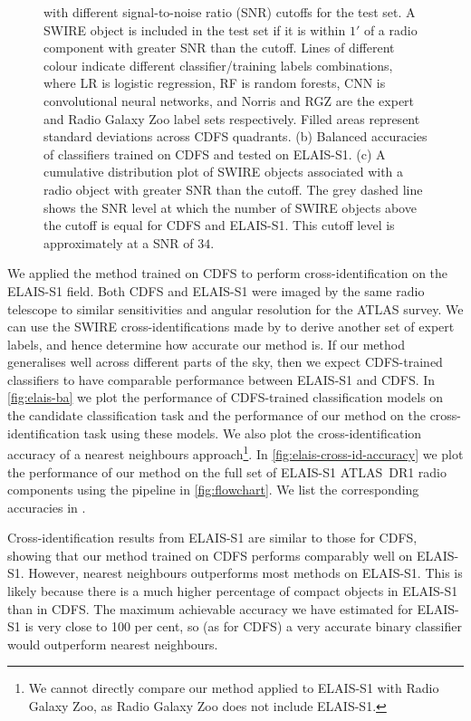 \begin{figure}
{      with different signal-to-noise ratio (SNR) cutoffs for the test set. A
      SWIRE object is included in the test set if it is within $1'$ of a radio
      component with greater SNR than the cutoff. Lines of different colour
      indicate different classifier/training labels combinations, where LR is
      logistic regression, RF is random forests, CNN is convolutional neural
      networks, and Norris and RGZ are the expert and Radio Galaxy Zoo label
      sets respectively. Filled areas represent standard deviations across
      CDFS quadrants. (b) Balanced accuracies of classifiers trained on CDFS
      and tested on ELAIS-S1. (c) A cumulative distribution plot of SWIRE
      objects associated with a radio object with greater SNR than the cutoff.
      The grey dashed line shows the SNR level at which the number of SWIRE
      objects above the cutoff is equal for CDFS and ELAIS-S1. This cutoff level
      is approximately at a SNR of $34$.}
    \label{fig:accuracies-flux}
  \end{figure}

  We applied the method trained on CDFS to perform cross-identification on the
  ELAIS-S1 field. Both CDFS and ELAIS-S1 were imaged by the same radio
  telescope to similar sensitivities and angular resolution for the ATLAS
  survey. {We can use the SWIRE cross-identifications made by
  \citet{middelberg08} to derive another set of expert labels, and hence
  determine how accurate our method is. If our method generalises well across
  different parts of the sky, then we expect CDFS-trained classifiers to have
  comparable performance between ELAIS-S1 and CDFS}. In \autoref{fig:elais-ba}
  we plot the performance of CDFS-trained classification models on the candidate classification task and
  the performance of our method on the cross-identification task using these models. We also plot
  the cross-identification accuracy of a nearest neighbours approach\footnote{{We cannot
  directly compare our method applied to ELAIS-S1 with Radio Galaxy Zoo, as
  Radio Galaxy Zoo does not include ELAIS-S1.}}. In
  \autoref{fig:elais-cross-id-accuracy} we plot the performance of our method
  on the full set of ELAIS-S1 ATLAS~DR1 radio components using the pipeline in
  \autoref{fig:flowchart}. We list the corresponding accuracies in
  .

  Cross-identification results from ELAIS-S1 are similar to those for CDFS,
  showing that our method trained on CDFS performs comparably well on
  ELAIS-S1. However, nearest neighbours outperforms most methods on ELAIS-S1.
  This is likely because there is a much higher percentage of compact objects
  in ELAIS-S1 than in CDFS. The maximum achievable accuracy we have estimated
  for ELAIS-S1 is very close to 100 per cent, so (as for CDFS) a very accurate
  binary classifier would outperform nearest neighbours.

